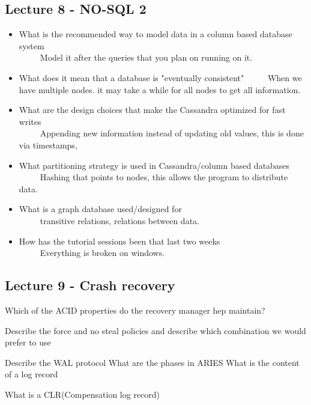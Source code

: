 \documentclass[a4paper,10pt,titlepage]{report}
\begin{document}
\subsection{Lecture 8 - NO-SQL 2}
\begin{itemize}
\item What is the recommended way to model data in a column based database system\\
\ \ \ \ \ Model it after the queries that you plan on running on it.


\item What does it mean that a database is "eventually consistent"
\ \ \ \ \ When we have multiple nodes. it may take a while for all nodes to get all information. 

\item What are the design choices that make the Cassandra optimized for fast writes\\
\ \ \ \ \ Appending new information instead of updating old values, this is done via timestamps,

\item What partitioning strategy is used in Cassandra/column based databases \\
\ \ \ \ \ Hashing that points to nodes, this allows the program to distribute data.


\item What is a graph database used/designed for \\
\ \ \ \ \ transitive relations, relations between data.

\item How has the tutorial sessions been that last two weeks \\
\ \ \ \ \ Everything is broken on windows.

\end{itemize}


\subsection{Lecture 9 - Crash recovery}
	Which of the ACID properties do the recovery manager hep maintain?
    
    Describe the force and no steal policies and describe which combination we would prefer to use
    
    Describe the WAL protocol
    What are the phases in ARIES
    What is the content of a log record
    
    What is a CLR(Compensation log record)
    
\end{document}
